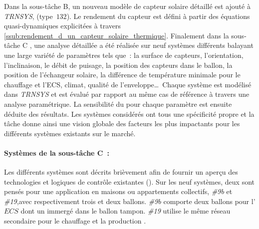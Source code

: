 Dans la sous-tâche B, un nouveau modèle de capteur solaire détaillé est ajouté à
\textit{TRNSYS}, (type~$132$). Le rendement du capteur est défini à partir des équations
quasi-dynamiques explicitées à travers \ref{ssub:rendement_d_un_capteur_solaire_thermique}.
Finalement dans la sous-tâche C \parencite{Task26C2007}, une analyse détaillée a été
réalisée sur neuf systèmes différents balayant une large variété de paramètres tels que~:
la surface de capteurs, l’orientation, l’inclinaison, le débit de puisage, la position des
capteurs dans le ballon, la position de l’échangeur solaire, la différence de température
minimale pour le chauffage et l’ECS, climat, qualité de l’enveloppe\dots\ Chaque système
est modélisé dans \textit{TRNSYS} et est évalué par rapport au même cas de référence à
travers une analyse paramétrique. La sensibilité du  pour chaque paramètre est
ensuite déduite des résultats. Les systèmes considérés ont tous une spécificité propre et
la tâche donne ainsi une vision globale des facteurs les plus impactants pour les
différents systèmes existants sur le marché.

\paragraph{Systèmes de la sous-tâche C~:} %
\label{par:systemes_de_la_sous_tache_c}
Les différents systèmes sont décrits brièvement afin de fournir un aperçu des
technologies et logiques de contrôle existantes ().
Sur les neuf systèmes, deux sont pensés pour une application en maisons ou appartements
collectifs, \emph{\#9b} et \emph{\#19},avec respectivement trois et deux ballons.
\emph{\#9b} comporte deux ballons pour l’$ECS$ dont un immergé
dans le ballon tampon. \emph{\#19} utilise le même réseau secondaire pour le chauffage
et la production .

